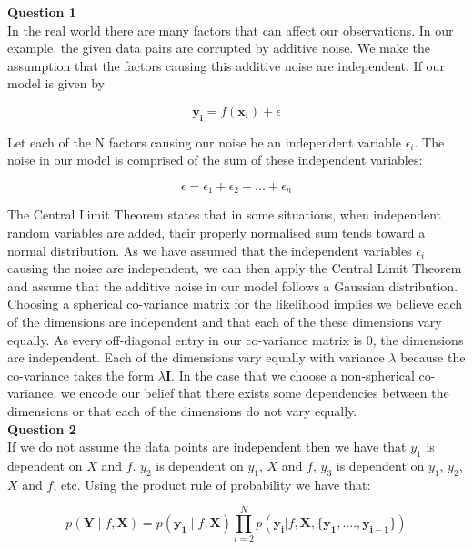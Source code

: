 \documentclass[10pt, a4paper, twocolumn]{article} %
\begin{document}
\begin{enumerate}

\textbf{Question 1}\\
In the real world there are many factors that can affect our observations. In our example, the given data pairs are corrupted by additive noise. We make the assumption that the factors causing this additive noise are independent.
If our model is given by 
   
\begin{equation}
      \mathbf{y_i} = f(\mathbf{x_i}) + \epsilon
\end{equation}
   
Let each of the N factors causing our noise be an independent variable $\epsilon_i$. The noise in our model is comprised of the sum of these independent variables:
   
\begin{equation}
       \epsilon = \epsilon_1 + \epsilon_2 + ... + \epsilon_n
\end{equation}
   
The Central Limit Theorem states that in some situations, when independent random variables are added, their properly normalised sum tends toward a normal distribution. As we have assumed that the independent variables $\epsilon_i$ causing the noise are independent, we can then apply the Central Limit Theorem and assume that the additive noise in our model follows a Gaussian distribution.\\
  
Choosing a spherical co-variance matrix for the likelihood implies we believe each of the dimensions are independent and that each of the these dimensions vary equally. As every off-diagonal entry in our co-variance matrix is $0$, the dimensions are independent. Each of the dimensions vary equally with variance $\lambda$ because the co-variance takes the form $\lambda\mathbf{I}$. In the case that we choose a non-spherical co-variance, we encode our belief that there exists some dependencies between the dimensions or that each of the dimensions do not vary equally.\\
 
\textbf{Question 2}\\
If we do not assume the data points are independent then we have that $y_1$ is dependent on $X$ and $f$. $y_2$ is dependent on $y_1$, $X$ and $f$, $y_3$ is dependent on $y_1$, $y_2$, $X$ and $f$, etc. Using the product rule of probability we have that:

\begin{equation}
p(\mathbf{Y}\mid f,\mathbf{X}) = p(\mathbf{y_1}\mid f, \mathbf{X})\prod_{i = 2}^{N} p\left( \mathbf{y_i} | f, \mathbf{X}, \{\mathbf{y_1}, ...., \mathbf{y_{i-1}}\} \right)
\end{equation}
  

\end{enumerate}
\end{document}
